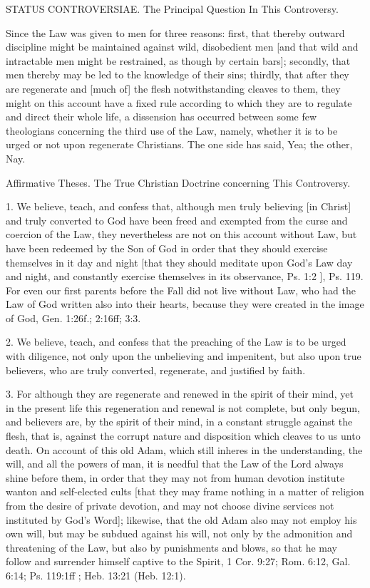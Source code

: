 STATUS CONTROVERSIAE.
The Principal Question In This Controversy.

Since the Law was given to men for three reasons: first, that thereby outward discipline might be maintained against wild, disobedient men [and that wild and intractable men might be restrained, as though by certain bars]; secondly, that men thereby may be led to the knowledge of their sins; thirdly, that after they are regenerate and [much of] the flesh notwithstanding cleaves to them, they might on this account have a fixed rule according to which they are to regulate and direct their whole life, a dissension has occurred between some few theologians concerning the third use of the Law, namely, whether it is to be urged or not upon regenerate Christians. The one side has said, Yea; the other, Nay.

Affirmative Theses.
The True Christian Doctrine concerning This Controversy.

1. We believe, teach, and confess that, although men truly believing [in Christ] and truly converted to God have been freed and exempted from the curse and coercion of the Law, they nevertheless are not on this account without Law, but have been redeemed by the Son of God in order that they should exercise themselves in it day and night [that they should meditate upon God's Law day and night, and constantly exercise themselves in its observance, Ps. 1:2 ], Ps. 119. For even our first parents before the Fall did not live without Law, who had the Law of God written also into their hearts, because they were created in the image of God, Gen. 1:26f.; 2:16ff; 3:3.

2. We believe, teach, and confess that the preaching of the Law is to be urged with diligence, not only upon the unbelieving and impenitent, but also upon true believers, who are truly converted, regenerate, and justified by faith.

3. For although they are regenerate and renewed in the spirit of their mind, yet in the present life this regeneration and renewal is not complete, but only begun, and believers are, by the spirit of their mind, in a constant struggle against the flesh, that is, against the corrupt nature and disposition which cleaves to us unto death. On account of this old Adam, which still inheres in the understanding, the will, and all the powers of man, it is needful that the Law of the Lord always shine before them, in order that they may not from human devotion institute wanton and self-elected cults [that they may frame nothing in a matter of religion from the desire of private devotion, and may not choose divine services not instituted by God's Word]; likewise, that the old Adam also may not employ his own will, but may be subdued against his will, not only by the admonition and threatening of the Law, but also by punishments and blows, so that he may follow and surrender himself captive to the Spirit, 1 Cor. 9:27; Rom. 6:12, Gal. 6:14; Ps. 119:1ff ; Heb. 13:21 (Heb. 12:1).


